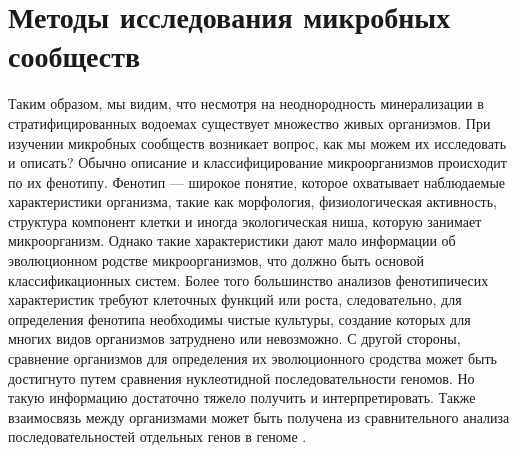 \section{Методы исследования микробных сообществ}
Таким образом, мы видим, что несмотря на неоднородность минерализации в стратифицированных водоемах существует множество живых организмов. При изучении микробных
сообществ возникает вопрос, как мы можем их исследовать и описать? Обычно описание и
классифицирование микроорганизмов происходит по их фенотипу. Фенотип — широкое понятие, которое охватывает наблюдаемые характеристики организма, такие как морфология,
физиологическая активность, структура компонент клетки и иногда экологическая ниша,
которую занимает микроорганизм. Однако такие характеристики дают мало информации об
эволюционном родстве микроорганизмов, что должно быть основой классификационных систем. Более того большинство анализов фенотипичесих характеристик требуют клеточных
функций или роста, следовательно, для определения фенотипа необходимы чистые культуры, создание которых для многих видов организмов затруднено или невозможно. С другой
стороны, сравнение организмов для определения их эволюционного сродства может быть
достигнуто путем сравнения нуклеотидной последовательности геномов. Но такую информацию достаточно тяжело получить и интерпретировать. Также взаимосвязь между организмами может быть получена из сравнительного анализа последовательностей отдельных
генов в геноме \cite{Hugenholtz1996}.

